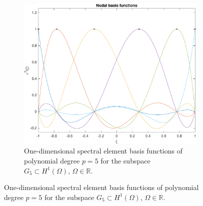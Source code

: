 \documentclass{project-logbook}
\begin{document}
\begin{figure}[htp]
\begin{subfigure}{0.48\textwidth}
        						\includegraphics[width=\textwidth]{figures/sfem_1D_p5.pdf}
        						\caption{One-dimensional spectral element basis functions of polynomial degree $p = 5$ for the subspace $G_{5} \subset H^{1}(\Omega)$, $\Omega\in\mathbb{R}$.}
    				\end{subfigure}

				\vspace{1cm}


\end{figure}
\end{document}
